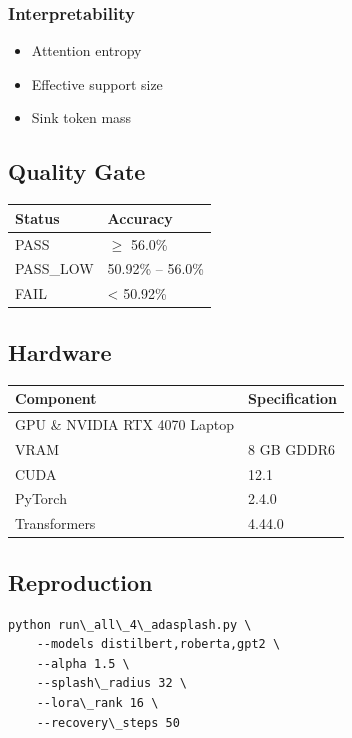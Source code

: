 \subsubsection{Interpretability}
\begin{itemize}
\item Attention entropy
\item Effective support size
\item Sink token mass

\end{itemize}
\subsection{Quality Gate}

\begin{table}[H]
\centering
\small
\begin{tabular}{ll}
\toprule
\textbf{Status} & \textbf{Accuracy} \\
\midrule
PASS & $\ge$ 56.0\% \\
PASS\_LOW & 50.92\% -- 56.0\% \\
FAIL & \textless{} 50.92\% \\
\bottomrule
\end{tabular}
\end{table}

\subsection{Hardware}

\begin{table}[H]
\centering
\small
\begin{tabular}{ll}
\toprule
\textbf{Component} & \textbf{Specification} \\
\midrule
GPU \& NVIDIA RTX 4070 Laptop \\
VRAM & 8 GB GDDR6 \\
CUDA & 12.1 \\
PyTorch & 2.4.0 \\
Transformers & 4.44.0 \\
\bottomrule
\end{tabular}
\end{table}

\subsection{Reproduction}

\begin{lstlisting}
python run\_all\_4\_adasplash.py \
    --models distilbert,roberta,gpt2 \
    --alpha 1.5 \
    --splash\_radius 32 \
    --lora\_rank 16 \
    --recovery\_steps 50
\end{lstlisting}

